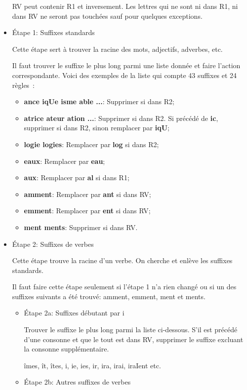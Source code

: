 \begin{itemize}
RV peut contenir R1 et inversement.
Les lettres qui ne sont ni dans R1, ni dans RV ne seront pas touchées sauf pour quelques exceptions.

\item{Étape 1: Suffixes standards}

Cette étape sert à trouver la racine des mots, adjectifs, adverbes, etc.

Il faut trouver le suffixe le plus long parmi une liste donnée et faire l'action correspondante.
Voici des exemples de la liste qui compte 43 suffixes et 24 règles~: 

\begin{itemize}
  \item \textbf{ance iqUe isme able ...}: Supprimer si dans R2;
  \item \textbf{atrice ateur ation ...}: Supprimer si dans R2. Si précédé de \textbf{ic}, supprimer si dans R2, sinon remplacer par \textbf{iqU};
  \item \textbf{logie logies}: Remplacer par \textbf{log} si dans R2;
  \item \textbf{eaux}: Remplacer par \textbf{eau};
  \item \textbf{aux}: Remplacer par \textbf{al} si dans R1;
  \item \textbf{amment}: Remplacer par \textbf{ant} si dans RV;
  \item \textbf{emment}: Remplacer par \textbf{ent} si dans RV;
  \item \textbf{ment ments}: Supprimer si dans RV.
\end{itemize}

\item{Étape 2: Suffixes de verbes}

Cette étape trouve la racine d'un verbe.
On cherche et enlève les suffixes standards.

Il faut faire cette étape seulement si l'étape 1 n'a rien changé ou si un des suffixes suivants a été trouvé: amment, emment, ment et ments.

\begin{itemize}
\item{Étape 2a: Suffixes débutant par i}

Trouver le suffixe le plus long parmi la liste ci-dessous.
S'il est précédé d'une consonne et que le tout est dans RV, supprimer le suffixe excluant la consonne supplémentaire.

îmes, ît, îtes, i, ie, ies, ir, ira, irai, iraIent etc.

\item{Étape 2b: Autres suffixes de verbes}


\end{itemize}
\end{itemize}
